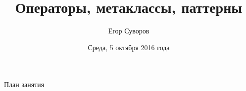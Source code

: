 \documentclass[utf8,xcolor=table]{beamer}
\title{Операторы, метаклассы, паттерны}
\author{Егор Суворов}
\institute[СПб АУ]{Курс <<Парадигмы и языки программирования>>, подгруппа 3}
\date[05.10.2016]{Среда, 5 октября 2016 года}
\begin{document}
\begin{frame}
\titlepage
\end{frame}

\begin{frame}{План занятия}
	\tableofcontents
\end{frame}









\end{document}
